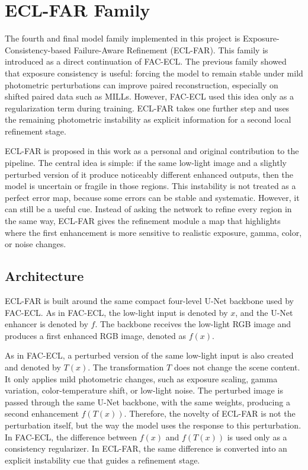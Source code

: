 \section{ECL-FAR Family}

The fourth and final model family implemented in this project is Exposure-Consistency-based Failure-Aware Refinement (ECL-FAR). This family is introduced as a direct continuation of FAC-ECL. The previous family showed that exposure consistency is useful: forcing the model to remain stable under mild photometric perturbations can improve paired reconstruction, especially on shifted paired data such as MILLs. However, FAC-ECL used this idea only as a regularization term during training. ECL-FAR takes one further step and uses the remaining photometric instability as explicit information for a second local refinement stage.

ECL-FAR is proposed in this work as a personal and original contribution to the pipeline. The central idea is simple: if the same low-light image and a slightly perturbed version of it produce noticeably different enhanced outputs, then the model is uncertain or fragile in those regions. This instability is not treated as a perfect error map, because some errors can be stable and systematic. However, it can still be a useful cue. Instead of asking the network to refine every region in the same way, ECL-FAR gives the refinement module a map that highlights where the first enhancement is more sensitive to realistic exposure, gamma, color, or noise changes.

\subsection{Architecture}

ECL-FAR is built around the same compact four-level U-Net backbone used by FAC-ECL. As in FAC-ECL, the low-light input is denoted by $x$, and the U-Net enhancer is denoted by $f$. The backbone receives the low-light RGB image and produces a first enhanced RGB image, denoted as $f(x)$.

As in FAC-ECL, a perturbed version of the same low-light input is also created and denoted by $T(x)$. The transformation $T$ does not change the scene content. It only applies mild photometric changes, such as exposure scaling, gamma variation, color-temperature shift, or low-light noise. The perturbed image is passed through the same U-Net backbone, with the same weights, producing a second enhancement $f(T(x))$. Therefore, the novelty of ECL-FAR is not the perturbation itself, but the way the model uses the response to this perturbation. In FAC-ECL, the difference between $f(x)$ and $f(T(x))$ is used only as a consistency regularizer. In ECL-FAR, the same difference is converted into an explicit instability cue that guides a refinement stage.

